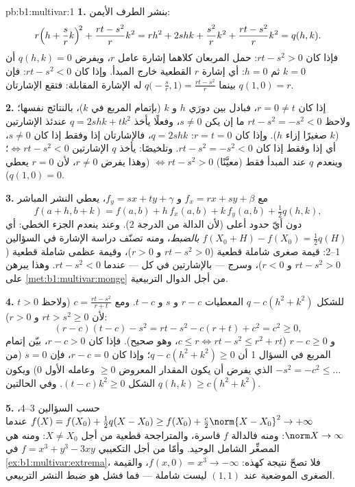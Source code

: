 \begin{solution}{pb:b1:multivar:1}
\textbf{1.} بنشر الطرف الأيمن:
\[
r\Bigl(h + \frac srk\Bigr)^{\!2} + \frac{rt - s^2}{r}k^2
= rh^2 + 2shk + \frac{s^2}{r}k^2 + \frac{rt - s^2}{r}k^2
= q(h,k) .
\]
فإذا كان $rt - s^2 > 0$: حمل المربعان كلاهما إشارة عامل $r$،
ويفرض $q(h,k) = 0$ أن $k = 0$ ثم $h = 0$: أي إشارة $r$ القطعية
خارج المبدأ. وإذا كان $rt - s^2 < 0$: فإن $q(1, 0) = r$ بينما
$q\bigl(-\frac sr, 1\bigr) = \frac{rt - s^2}{r}$ له
الإشارة المقابلة: فتقع الإشارتان.

\textbf{2.} إذا كان $r = 0 \neq t$، فبادل بين دورَي $h$ و $k$
(بإتمام المربع في $k$)، بالنتائج نفسها؛ ولاحظ
$rt - s^2 = -s^2 < 0$ ما إن يكن $s \neq 0$، وفعلًا يأخذ $q =
2shk + tk^2$ عندئذ الإشارتين ($k$ صغيرًا إزاء $h$). وإذا كان
$r = t = 0$: $q = 2shk$، فالإشارتان إذا وفقط إذا كان $s \neq 0$، أي إذا وفقط إذا كان
$rt - s^2 = -s^2 < 0$. وتلخيصًا: يأخذ $q$ الإشارتين $\iff rt -
s^2 < 0$؛ وينعدم $q$ عند المبدأ فقط (معيَّنًا) $\iff rt -
s^2 > 0$ (وهذا يفرض $r \neq 0$، لأن $r = 0$ يعطي $q(1,0) =
0$).

\textbf{3.} مع $f_x = rx + sy + \beta$ و $f_y = sx + ty +
\gamma$، يعطي النشر المباشر
\[
f(a + h, b + k) = f(a, b) + h\,f_x(a,b) + k\,f_y(a,b)
+ \tfrac12 q(h, k),
\]
دون أيّ حدود أعلى (لأن الدالة  من الدرجة
$2$). وعند  ينعدم الجزء الخطي: أي $f(X_0 + H)
- f(X_0) = \frac12 q(H)$ \emph{بالضبط}، ومنه تصنّف دراسة الإشارة في
السؤالين 1--2: قيمة صغرى شاملة قطعية ($rt - s^2 >
0$ و $r > 0$)، وقيمة عظمى شاملة قطعية ($rt - s^2 > 0$ و $r < 0$)،
وسرج --- بالإشارتين في كل  --- عندما $rt - s^2 <
0$. وهذا يبرهن على \cref{met:b1:multivar:monge} من أجل الدوال
التربيعية.

\textbf{4.} للشكل $q - c(h^2 + k^2)$ المعطيات $r - c$ و $s$ و
$t - c$. ومع $c = \frac{rt - s^2}{r + t}$ (ولاحظ $t > 0$ لأن
$rt > s^2 \geq 0$ و $r > 0$):
\[
(r - c)(t - c) - s^2 = rt - s^2 - c(r + t) + c^2 = c^2 \geq 0,
\]
و $r - c \geq 0$ ($c \leq r \iff rt - s^2 \leq r^2 + rt$،
وهو صحيح). فإذا كان $r - c > 0$، بيّن إتمام المربع في السؤال 1 أن
$q - c(h^2 + k^2) \geq 0$؛ وإذا كان $r - c = 0$، فإن $s = 0$ (من
$-s^2 = -c^2 \leq \dots$ الذي يفرض أن يكون المقدار المعروض
$\geq 0$ وعامله الأول $0$) ويكون الشكل $(t - c)k^2 \geq
0$. وفي الحالتين $q(h,k) \geq c(h^2 + k^2)$.

\textbf{5.} حسب السؤالين 3--4، $f(X) = f(X_0) + \frac12 q(X -
X_0) \geq f(X_0) + \frac c2\norm{X - X_0}^2 \to +\infty$ عندما
$\norm X \to \infty$: ومنه فالدالة $f$ قاسرة، والمتراجحة
قطعية من أجل $X \neq X_0$: ومنه  هي المصغِّر
الشامل الوحيد. وأمّا من أجل التكعيبي $f = x^3 + y^3 - 3xy$ في
\cref{ex:b1:multivar:extrema}، فلا تصحّ نتيجة كهذه: $f(x,0)
= x^3 \to -\infty$، والقيمة الصغرى الموضعية عند $(1,1)$ ليست
شاملة --- فما فشل هو ضبط النشر التربيعي.


\end{solution}
